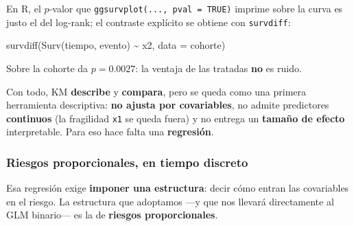 \documentclass[
  letterpaper,
  DIV=11,
  numbers=noendperiod]{scrartcl}
\newenvironment{Shaded}{\begin{snugshade}}{\end{snugshade}}
\newcommand{\AttributeTok}[1]{\textcolor[rgb]{0.40,0.45,0.13}{#1}}
\newcommand{\FunctionTok}[1]{\textcolor[rgb]{0.28,0.35,0.67}{#1}}
\newcommand{\NormalTok}[1]{\textcolor[rgb]{0.00,0.23,0.31}{#1}}
\newcommand{\SpecialCharTok}[1]{\textcolor[rgb]{0.37,0.37,0.37}{#1}}
\begin{document}
En R, el \(p\)-valor que \texttt{ggsurvplot(...,\ pval\ =\ TRUE)}
imprime sobre la curva es justo el del log-rank; el contraste explícito
se obtiene con \texttt{survdiff}:

\begin{Shaded}
\begin{Highlighting}[]
\FunctionTok{survdiff}\NormalTok{(}\FunctionTok{Surv}\NormalTok{(tiempo, evento) }\SpecialCharTok{\textasciitilde{}}\NormalTok{ x2, }\AttributeTok{data =}\NormalTok{ cohorte)}
\end{Highlighting}
\end{Shaded}

Sobre la cohorte da \(p=0.0027\): la ventaja de las tratadas \textbf{no}
es ruido.

Con todo, KM \textbf{describe} y \textbf{compara}, pero se queda como
una primera herramienta descriptiva: \textbf{no ajusta por covariables},
no admite predictores \textbf{continuos} (la fragilidad \texttt{x1} se
queda fuera) y no entrega un \textbf{tamaño de efecto} interpretable.
Para eso hace falta una \textbf{regresión}.

\hypertarget{sec-u15-prop}{%
\subsubsection{Riesgos proporcionales, en tiempo
discreto}\label{sec-u15-prop}}

Esa regresión exige \textbf{imponer una estructura}: decir cómo entran
las covariables en el riesgo. La estructura que adoptamos ---y que nos
llevará directamente al GLM binario--- es la de \textbf{riesgos
proporcionales}.
\end{document}
